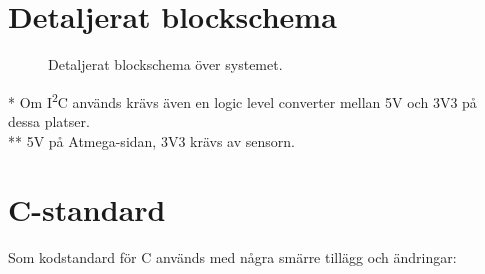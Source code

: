 \documentclass[a4paper,11pt]{article}
\begin{document}
\newpage
\begin{appendices}

\section{Detaljerat blockschema}
\begin{figure}[h!]
    \caption{Detaljerat blockschema över systemet.}
    \label{fig:modulesDetailed}
\end{figure}

\noindent \begin{small}
    * Om I\textsuperscript{2}C används krävs även en logic level converter mellan 5V och 3V3 på dessa platser.\\
    ** 5V på Atmega-sidan, 3V3 krävs av sensorn.
\end{small}

\section{C-standard} \label{sec:cstandard}
Som kodstandard för C används \cite{cstandard} med några smärre tillägg och ändringar:


\end{appendices}
\end{document}
